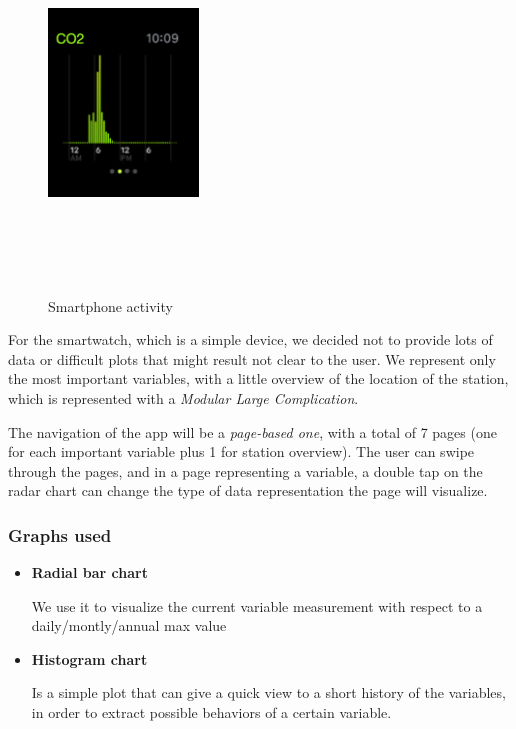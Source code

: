 \documentclass[12pt]{article} %
\begin{document}
\begin{figure}[H]
  \includegraphics[width=4cm,height=10cm,keepaspectratio]{img/histoAW.png}
  \hfill
  \caption{Smartphone activity}
  \label{fig:boat1}
\end{figure}
For the smartwatch, which is a simple device, we decided not to provide lots of data or difficult plots that might result not clear to the user.
We represent only the most important variables, with a little overview of the location of the station, which is represented with a \textit{Modular Large Complication}.

The navigation of the app will be a \textit{page-based one}, with a total of 7 pages (one for each important variable plus 1 for station overview).
The user can swipe through the pages, and in a page representing a variable, a double tap on the radar chart can change the type of data representation the page will visualize.

\subsubsection{Graphs used}
\begin{itemize}
\item \textbf{Radial bar chart}

We use it to visualize the current variable measurement with respect to a daily/montly/annual max value
\item \textbf{Histogram chart}

Is a simple plot that can give a quick view to a short history of the variables, in order to extract possible behaviors of a certain variable.
\end{itemize}
\end{document}
